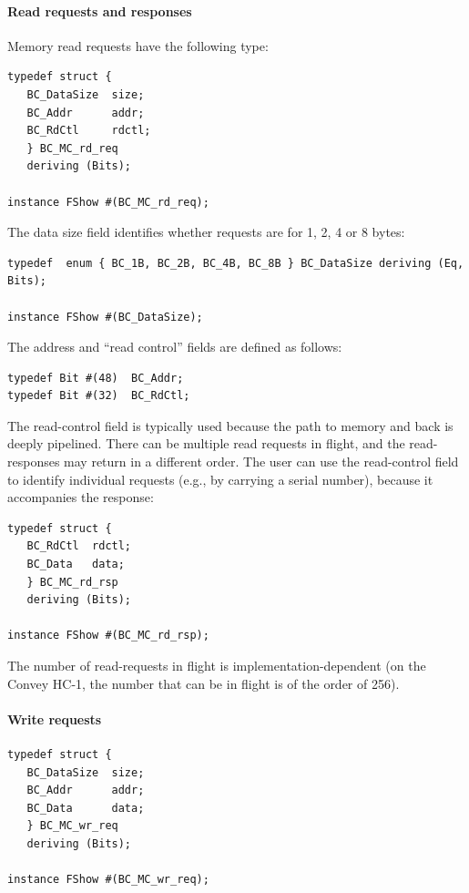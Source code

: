 \documentclass[twoside,letterpaper,11pt]{article}
\newcommand{\hm}{\hspace*{1em}}
\begin{document}

\paragraph{Read requests and responses}
\hm

Memory read requests have the following type:
\begin{Verbatim}[frame=single, label=BC\_HW\_IFC.bsv]
typedef struct {
   BC_DataSize  size;
   BC_Addr      addr;
   BC_RdCtl     rdctl;
   } BC_MC_rd_req
   deriving (Bits);

instance FShow #(BC_MC_rd_req);
\end{Verbatim} 
The data size field identifies whether requests are for 1, 2, 4 or 8 bytes:
\begin{Verbatim}[frame=single, label=BC\_HW\_IFC.bsv] 
typedef  enum { BC_1B, BC_2B, BC_4B, BC_8B } BC_DataSize deriving (Eq, Bits);

instance FShow #(BC_DataSize);
\end{Verbatim}
The address and ``read control'' fields are defined as follows:
\begin{Verbatim}[frame=single, label=BC\_HW\_IFC.bsv]
typedef Bit #(48)  BC_Addr;
typedef Bit #(32)  BC_RdCtl;
\end{Verbatim}
The read-control field is typically used because the path to memory
and back is deeply pipelined.  There can be multiple read requests in
flight, and the read-responses may return in a different order.  The
user can use the read-control field to identify individual requests
(e.g., by carrying a serial number), because it accompanies the
response:
\begin{Verbatim}[frame=single, label=BC\_HW\_IFC.bsv]
typedef struct {
   BC_RdCtl  rdctl;
   BC_Data   data;
   } BC_MC_rd_rsp
   deriving (Bits);

instance FShow #(BC_MC_rd_rsp);
\end{Verbatim}
The number of read-requests in flight is implementation-dependent (on
the Convey HC-1, the number that can be in flight is of the order of
256).


\paragraph{Write requests}
\hm

\begin{Verbatim}[frame=single, label=BC\_HW\_IFC.bsv]
typedef struct {
   BC_DataSize  size;
   BC_Addr      addr;
   BC_Data      data;
   } BC_MC_wr_req
   deriving (Bits);

instance FShow #(BC_MC_wr_req);
\end{Verbatim}
\end{document}
